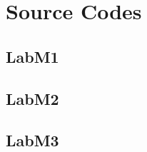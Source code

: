 \documentclass{article}
\begin{document}
\section{Source Codes}

\subsection{LabM1}


\subsection{LabM2}


\subsection{LabM3}


\end{document}
